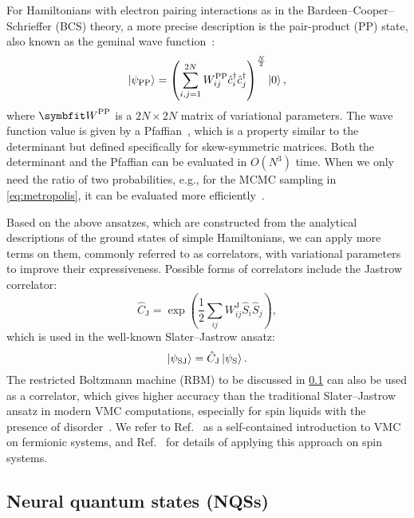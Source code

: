 For Hamiltonians with electron pairing interactions as in the Bardeen--Cooper--Schrieffer (BCS) theory, a more precise description is the pair-product (PP) state, also known as the geminal wave function~\cite{bouchaud1988pair, gros1988superconductivity, tahara2008variational, astrakhantsev2021broken}:
\begin{equation}
\ket{\psi_\text{PP}} = \left( \sum_{i, j = 1}^{2 N} W^\text{PP}_{i j} \hat{c}^\dagger_i \hat{c}^\dagger_j \right)^{\frac{N}{2}} \ket{0},
\end{equation}
where $\mW^\text{PP}$ is a $2 N \times 2 N$ matrix of variational parameters. The wave function value is given by a Pfaffian~\cite{cayley1849determinants}, which is a property similar to the determinant but defined specifically for skew-symmetric matrices. Both the determinant and the Pfaffian can be evaluated in $O(N^3)$ time. When we only need the ratio of two probabilities, e.g., for the MCMC sampling in \cref{eq:metropolis}, it can be evaluated more efficiently~\cite{becca2017quantum}.

Based on the above ansatzes, which are constructed from the analytical descriptions of the ground states of simple Hamiltonians, we can apply more terms on them, commonly referred to as correlators, with variational parameters to improve their expressiveness. Possible forms of correlators include the Jastrow correlator:
\begin{equation}
\hat{C}_\text{J} = \exp\left( {\frac{1}{2} \sum_{i j} W^\text{J}_{i j} \hat{S}_i \hat{S}_j} \right),
\end{equation}
which is used in the well-known Slater--Jastrow ansatz:
\begin{equation}
\ket{\psi_\text{SJ}} = \hat{C}_\text{J} \ket{\psi_\text{S}}.
\end{equation}
The restricted Boltzmann machine (RBM) to be discussed in \cref{sec:nqs} can also be used as a correlator, which gives higher accuracy than the traditional Slater--Jastrow ansatz in modern VMC computations, especially for spin liquids with the presence of disorder~\cite{nomura2017restricted, ferrari2019neural, nomura2021dirac}. We refer to Ref.~\cite{becca2017quantum} as a self-contained introduction to VMC on fermionic systems, and Ref.~\cite{ferrari2019static} for details of applying this approach on spin systems.

\subsection{Neural quantum states (NQSs)}
\label{sec:nqs}

